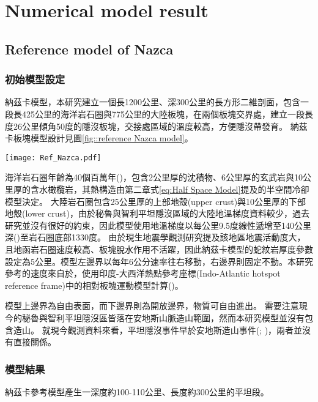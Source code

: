 
\chapter{Numerical model result}

\section{Reference model of Nazca}
\subsection{初始模型設定}
納茲卡模型，本研究建立一個長1200公里、深300公里的長方形二維剖面，包含一段長425公里的海洋岩石圈與775公里的大陸板塊，在兩個板塊交界處，建立一段長度26公里傾角50度的隱沒板塊，交接處區域的溫度較高，方便隱沒帶發育。
納茲卡板塊模型設計見圖\ref{fig::reference Nazca model}。

\begin{figure*}[hb]
    \centering
    \texttt{[image: Ref\_Nazca.pdf]}
    \caption[納茲卡板塊隱沒模型設計與邊界條件示意圖]{納茲卡板塊隱沒模型設計與邊界條件示意圖}
    \label{fig::reference Nazca model}
\end{figure*}


海洋岩石圈年齡為40個百萬年(\citealp{muller2019})，包含2公里厚的沈積物、6公里厚的玄武岩與10公里厚的含水橄欖岩，其熱構造由第二章式\ref{eq:Half Space Model}提及的半空間冷卻模型決定。
大陸岩石圈包含25公里厚的上部地殼(upper crust)與10公里厚的下部地殼(lower crust)，由於秘魯與智利平坦隱沒區域的大陸地溫梯度資料較少，過去研究並沒有很好的約束，因此模型使用地溫梯度以每公里9.5度線性遞增至140公里深(\citealp{perez2008})至岩石圈底部1330度。
由於現生地震學觀測研究提及該地區地震活動度大，且地函岩石圈速度較高、板塊脫水作用不活躍，因此納茲卡模型的蛇紋岩厚度參數設定為5公里。模型左邊界以每年6公分速率往右移動，右邊界則固定不動。本研究參考的速度來自於\citealp{o2005uncertainties}，使用印度-大西洋熱點參考座標(Indo-Atlantic hotspot reference frame)中的相對板塊運動模型計算(\citealp{schellart2008global})。

模型上邊界為自由表面，而下邊界則為開放邊界，物質可自由進出。
需要注意現今的秘魯與智利平坦隱沒區皆落在安地斯山脈造山範圍，然而本研究模型並沒有包含造山。
就現今觀測資料來看，平坦隱沒事件早於安地斯造山事件(\citealp{chen2019southward}; \citealp{hu2021southward})，兩者並沒有直接關係。


\subsection{模型結果}
納茲卡參考模型產生一深度約100-110公里、長度約300公里的平坦段。

